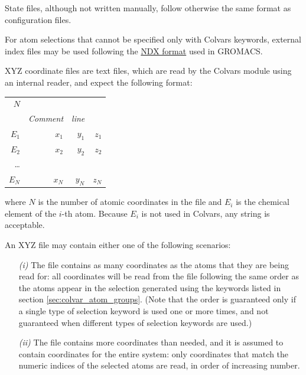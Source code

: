State files, although not written manually, follow otherwise the same format as configuration files.


For atom selections that cannot be specified only with Colvars keywords, external index files may be used following the \href{http://manual.gromacs.org/documentation/current/reference-manual/file-formats.html\#ndx}{NDX format} used in GROMACS.


XYZ coordinate files are text files, which are read by the Colvars module using an internal reader, and expect the following format:

\noindent\begin{tabular}{r r r r}
$N$\\
& \emph{Comment} & \emph{line} & \\
$E_{1}$ & $x_{1}$ & $y_{1}$ & $z_{1}$\\
$E_{2} $ & $x_{2}$ & $y_{2}$ & $z_{2}$\\
\ldots\\
$E_{N}$ & $x_{N}$ & $y_{N}$ & $z_{N}$ \\
\end{tabular}

\noindent{}where $N$ is the number of atomic coordinates in the file and $E_i$ is the chemical element of the $i$-th atom.
Because $E_i$ is not used in Colvars, any string is acceptable.

An XYZ file may contain either one of the following scenarios:
\begin{enumerate}
\item[\emph{(i)}] The file contains as many coordinates as the atoms that they are being read for: all coordinates will be read from the file following the same order as the atoms appear in the selection generated using the keywords listed in section \ref{sec:colvar_atom_groups}.
  (Note that the order is guaranteed only if a single type of selection keyword is used one or more times, and not guaranteed when different types of selection keywords are used.)
\item[\emph{(ii)}] The file contains more coordinates than needed, and it is assumed to contain coordinates for the entire system: only coordinates that match the numeric indices of the selected atoms are read, in order of increasing number.
\end{enumerate}

